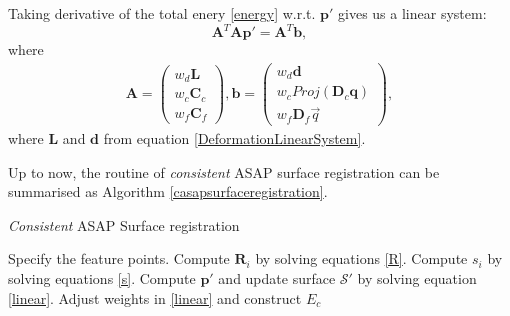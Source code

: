 Taking derivative of the total enery \eqref{energy} w.r.t. $\mathbf p'$ gives us a linear system:
\begin{equation}
\mathbf A^T\mathbf A\mathbf p' = \mathbf A^T\mathbf b,\label{linear}
\end{equation}
where
\begin{align*}
\mathbf A =\begin{pmatrix}w_{d}\mathbf L\\w_c\mathbf C_c\\w_f\mathbf C_f\end{pmatrix}, \mathbf b = \begin{pmatrix}w_{d}\mathbf d\\w_cProj(\mathbf D_c \mathbf q)\\w_f\mathbf D_f \vec q\end{pmatrix},
\end{align*}
where $\mathbf L$ and $\mathbf d$ from equation \eqref{DeformationLinearSystem}.

Up to now, the routine of \emph{consistent} ASAP surface registration can be summarised as Algorithm \eqref{casapsurfaceregistration}.
\begin{algorithm}[]
\caption{\emph{Consistent} ASAP Surface registration}
\label{casapsurfaceregistration}
\begin{algorithmic}[1]
    \State Specify the feature points.
            \State Compute $\mathbf R_i$ by solving equations \eqref{R}.
            \State Compute $s_i$ by solving equations \eqref{s}.
            \State Compute $\mathbf p'$ and update surface $\mathcal S'$ by solving equation \eqref{linear}.
        \EndWhile
        \State Adjust weights in \eqref{linear} and construct $E_c$
    \EndWhile
\end{algorithmic}
\end{algorithm}

